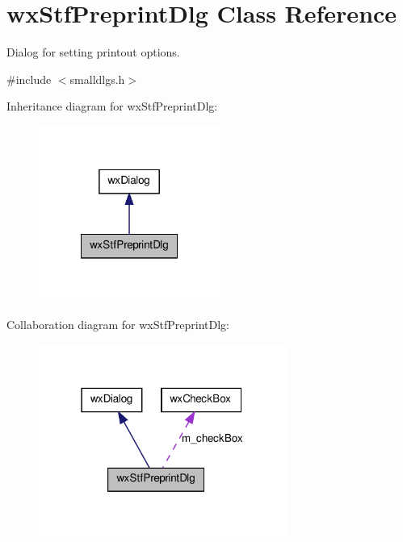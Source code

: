 \hypertarget{classwxStfPreprintDlg}{
\section{wxStfPreprintDlg Class Reference}
\label{classwxStfPreprintDlg}
}


Dialog for setting printout options.  




{\ttfamily \#include $<$smalldlgs.h$>$}



Inheritance diagram for wxStfPreprintDlg:
\nopagebreak
\begin{figure}[H]
\begin{center}
\leavevmode
\includegraphics[width=168pt]{classwxStfPreprintDlg__inherit__graph}
\end{center}
\end{figure}


Collaboration diagram for wxStfPreprintDlg:
\nopagebreak
\begin{figure}[H]
\begin{center}
\leavevmode
\includegraphics[width=231pt]{classwxStfPreprintDlg__coll__graph}
\end{center}
\end{figure}
